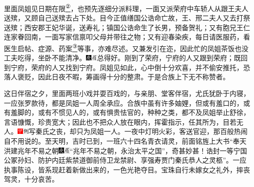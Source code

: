 里面凤姐见日期在限\href{../Text/part0018_split_000.html\#lnkback_2_a}{\textsuperscript{②}}，也预先逐细分派料理，一面又派荣府中车轿人从跟王夫人送殡，又顾自己送殡去占下处。目今正值缮国公诰命亡故，王、邢二夫人又去打祭送殡；西安郡王妃华诞，送寿礼；镇国公诰命生了长男，预备贺礼；又有胞兄王仁连家眷回南，一面写家信禀叩父母并带往之物；又有迎春染疾，每日请医服药，看医生启帖、症源、药案\href{../Text/part0018_split_000.html\#lnkback_3_a}{\textsuperscript{③}}等事，亦难尽述。又兼发引在迩，因此忙的凤姐茶饭也没工夫吃得，坐卧不能清净。{\includegraphics[width=3mm]{../Images/00004}\includegraphics[width=3mm]{../Images/00010}\footnotesize \kaishu 总得好。}刚到了荣府，宁府的人又跟到荣府；既回到宁府，荣府的人又找到宁府。凤姐见如此，心中倒十分欢喜，并不偷安推托，恐落人褒贬，因此日夜不暇，筹画得十分的整肃。于是合族上下无不称赞者。

这日伴宿之夕，里面两班小戏并耍百戏的，与亲朋、堂客伴宿，尤氏犹卧于内寝，一应张罗款待，都是凤姐一人周全承应。合族中虽有许多妯娌，但或有羞口的，或有羞脚的，或有不惯见人的，或有惧贵怯官的，种种之类，都不及凤姐举止舒徐，言语慷慨，珍贵宽大；因此也不把众人放在眼内，挥霍指示，任其所为，目若无人。{\includegraphics[width=3mm]{../Images/00002}\includegraphics[width=3mm]{../Images/00011}\footnotesize \kaishu 写秦氏之丧，却只为凤姐一人。}一夜中灯明火彩，客送官迎，那百般热闹自不用说的。至天明，吉时已到，一班六十四名青衣请灵，前面铭旌上大书``奉天洪建兆年不易之朝{\includegraphics[width=3mm]{../Images/00004}\includegraphics[width=3mm]{../Images/00010}\footnotesize \kaishu ``兆年不易之朝，永治太平之国''，奇甚妙甚！}诰封一等宁国公冢孙妇、防护内廷紫禁道御前侍卫龙禁尉、享强寿贾门秦氏恭人之灵柩''。一应执事陈设，皆系现赶着新做出来的，一色光艳夺目。宝珠自行未嫁女之礼外，摔丧驾灵，十分哀苦。

